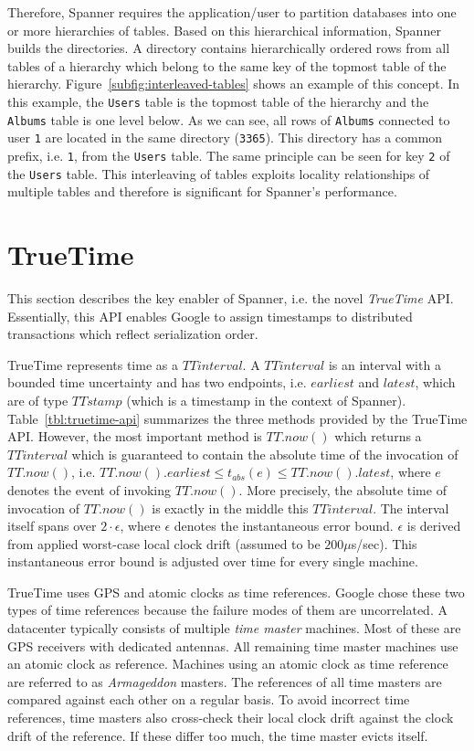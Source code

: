 \documentclass[onecolumn, a4paper, 10pt]{article}
\begin{document}
Therefore, Spanner requires the application/user to partition databases into
one or more hierarchies of tables. Based on this hierarchical information, Spanner
builds the directories. A directory contains hierarchically ordered rows from
all tables of a hierarchy which belong to the same key of the topmost table of
the hierarchy. Figure~\ref{subfig:interleaved-tables} shows an example of this
concept. In this example, the \texttt{Users} table is the topmost table of the
hierarchy and the \texttt{Albums} table is one level below. As we can see, all
rows of \texttt{Albums} connected to user \texttt{1} are located in the same
directory (\texttt{3365}). This directory has a common prefix, i.e. \texttt{1},
from the \texttt{Users} table. The same principle can be seen for key \texttt{2}
of the \texttt{Users} table. This interleaving of tables exploits locality
relationships of multiple tables and therefore is significant for Spanner's
performance.

\section{TrueTime}
\label{sec:truetime}

This section describes the key enabler of Spanner, i.e. the novel \emph{TrueTime}
API. Essentially, this API enables Google to assign timestamps to distributed
transactions which reflect serialization order.

TrueTime represents time as a $TTinterval$. A $TTinterval$ is an interval with a
bounded time uncertainty and has two endpoints, i.e. $earliest$ and $latest$,
which are of type $TTstamp$ (which is a timestamp in the context of Spanner).
Table~\ref{tbl:truetime-api} summarizes the three methods provided by the TrueTime
API. However, the most important method is $TT.now()$ which returns a $TTinterval$
which is guaranteed to contain the absolute time of the invocation of $TT.now()$,
i.e. $TT.now().earliest \leq t_{abs}(e) \leq TT.now().latest$, where $e$ denotes
the event of invoking $TT.now()$. More precisely, the absolute time of invocation
of $TT.now()$ is exactly in the middle this $TTinterval$. The interval itself
spans over $2\cdot\epsilon$, where $\epsilon$ denotes the instantaneous error
bound. $\epsilon$ is derived from applied worst-case local clock drift (assumed
to be $200\mu$s/sec). This instantaneous error bound is adjusted over time for
every single machine.

TrueTime uses GPS and atomic clocks as time references. Google chose these two
types of time references because the failure modes of them are uncorrelated. A
datacenter typically consists of multiple \emph{time master} machines. Most of
these are GPS receivers with dedicated antennas. All remaining time master
machines use an atomic clock as reference. Machines using an atomic clock as time
reference are referred to as \emph{Armageddon} masters. The references of all time
masters are compared against each other on a regular basis. To avoid incorrect
time references, time masters also cross-check their local clock drift against
the clock drift of the reference. If these differ too much, the time master evicts
itself.
\end{document}
